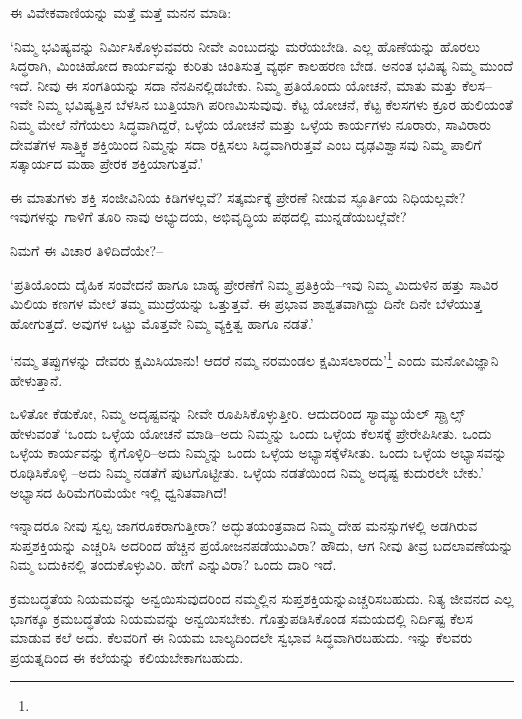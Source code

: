 ಈ ವಿವೇಕವಾಣಿಯನ್ನು ಮತ್ತೆ ಮತ್ತೆ ಮನನ ಮಾಡಿ:

‘ನಿಮ್ಮ ಭವಿಷ್ಯವನ್ನು ನಿರ್ಮಿಸಿಕೊಳ್ಳುವವರು ನೀವೇ ಎಂಬುದನ್ನು ಮರೆಯಬೇಡಿ. ಎಲ್ಲ ಹೊಣೆಯನ್ನು ಹೊರಲು ಸಿದ್ಧರಾಗಿ, ಮಿಂಚಿಹೋದ ಕಾರ್ಯವನ್ನು ಕುರಿತು ಚಿಂತಿಸುತ್ತ ವ್ಯರ್ಥ ಕಾಲಹರಣ ಬೇಡ. ಅನಂತ ಭವಿಷ್ಯ ನಿಮ್ಮ ಮುಂದೆ ಇದೆ. ನೀವು ಈ ಸಂಗತಿಯನ್ನು ಸದಾ ನೆನಪಿನಲ್ಲಿಡಬೇಕು. ನಿಮ್ಮ ಪ್ರತಿಯೊಂದು ಯೋಚನೆ, ಮಾತು ಮತ್ತು ಕೆಲಸ–ಇವೇ ನಿಮ್ಮ ಭವಿಷ್ಯತ್ತಿನ ಬೆಳಸಿನ ಬುತ್ತಿಯಾಗಿ ಪರಿಣಮಿಸುವುವು. ಕೆಟ್ಟ ಯೋಚನೆ, ಕೆಟ್ಟ ಕೆಲಸಗಳು ಕ್ರೂರ ಹುಲಿಯಂತೆ ನಿಮ್ಮ ಮೇಲೆ ನೆಗೆಯಲು ಸಿದ್ಧವಾಗಿದ್ದರೆ, ಒಳ್ಳೆಯ ಯೋಚನೆ ಮತ್ತು ಒಳ್ಳೆಯ ಕಾರ್ಯಗಳು ನೂರಾರು, ಸಾವಿರಾರು ದೇವತೆಗಳ ಸಾತ್ತ್ವಿಕ ಶಕ್ತಿಯಿಂದ ನಿಮ್ಮನ್ನು ಸದಾ ರಕ್ಷಿಸಲು ಸಿದ್ಧವಾಗಿರುತ್ತವೆ ಎಂಬ ದೃಢವಿಶ್ವಾಸವು ನಿಮ್ಮ ಪಾಲಿಗೆ ಸತ್ಕಾರ್ಯದ ಮಹಾ ಪ್ರೇರಕ ಶಕ್ತಿಯಾಗುತ್ತವೆ.’

ಈ ಮಾತುಗಳು ಶಕ್ತಿ ಸಂಜೀವಿನಿಯ ಕಿಡಿಗಳಲ್ಲವೆ? ಸತ್ಕರ್ಮಕ್ಕೆ ಪ್ರೇರಣೆ ನೀಡುವ ಸ್ಫೂರ್ತಿಯ ನಿಧಿಯಲ್ಲವೇ? ಇವುಗಳನ್ನು ಗಾಳಿಗೆ ತೂರಿ ನಾವು ಅಭ್ಯುದಯ, ಅಭಿವೃದ್ಧಿಯ ಪಥದಲ್ಲಿ ಮುನ್ನಡೆಯಬಲ್ಲೆವೇ?

ನಿಮಗೆ ಈ ವಿಚಾರ ತಿಳಿದಿದೆಯೇ?–

‘ಪ್ರತಿಯೊಂದು ದೈಹಿಕ ಸಂವೇದನೆ ಹಾಗೂ ಬಾಹ್ಯ ಪ್ರೇರಣೆಗೆ ನಿಮ್ಮ ಪ್ರತಿಕ್ರಿಯೆ–ಇವು ನಿಮ್ಮ ಮಿದುಳಿನ ಹತ್ತು ಸಾವಿರ ಮಿಲಿಯ ಕಣಗಳ ಮೇಲೆ ತಮ್ಮ ಮುದ್ರೆಯನ್ನು ಒತ್ತುತ್ತವೆ. ಈ ಪ್ರಭಾವ ಶಾಶ್ವತವಾಗಿದ್ದು ದಿನೇ ದಿನೇ ಬೆಳೆಯುತ್ತ ಹೋಗುತ್ತದೆ. ಅವುಗಳ ಒಟ್ಟು ಮೊತ್ತವೇ ನಿಮ್ಮ ವ್ಯಕ್ತಿತ್ವ ಹಾಗೂ ನಡತೆ.’

‘ನಮ್ಮ ತಪ್ಪುಗಳನ್ನು ದೇವರು ಕ್ಷಮಿಸಿಯಾನು! ಆದರೆ ನಮ್ಮ ನರಮಂಡಲ ಕ್ಷಮಿಸಲಾರದು’\footnote{

} ಎಂದು ಮನೋವಿಜ್ಞಾನಿ ಹೇಳುತ್ತಾನೆ.

ಒಳಿತೋ ಕೆಡುಕೋ, ನಿಮ್ಮ ಅದೃಷ್ಟವನ್ನು ನೀವೇ ರೂಪಿಸಿಕೊಳ್ಳುತ್ತೀರಿ. ಆದುದರಿಂದ ಸ್ಯಾಮ್ಯುಯೆಲ್ ಸ್ಮಾೖಲ್ಸ್ ಹೇಳುವಂತೆ ‘ಒಂದು ಒಳ್ಳೆಯ ಯೋಚನೆ ಮಾಡಿ–ಅದು ನಿಮ್ಮನ್ನು ಒಂದು ಒಳ್ಳೆಯ ಕೆಲಸಕ್ಕೆ ಪ್ರೇರೇಪಿಸೀತು. ಒಂದು ಒಳ್ಳೆಯ ಕಾರ್ಯವನ್ನು ಕೈಗೊಳ್ಳಿರಿ–ಅದು ನಿಮ್ಮನ್ನು ಒಂದು ಒಳ್ಳೆಯ ಅಭ್ಯಾಸಕ್ಕೆಳೆಸೀತು. ಒಂದು ಒಳ್ಳೆಯ ಅಭ್ಯಾಸವನ್ನು ರೂಢಿಸಿಕೊಳ್ಳಿ –ಅದು ನಿಮ್ಮ ನಡತೆಗೆ ಪುಟಗೊಟ್ಟೀತು. ಒಳ್ಳೆಯ ನಡತೆಯಿಂದ ನಿಮ್ಮ ಅದೃಷ್ಟ ಕುದುರಲೇ ಬೇಕು.’ ಅಭ್ಯಾಸದ ಹಿರಿಮೆಗರಿಮೆಯೇ ಇಲ್ಲಿ ಧ್ವನಿತವಾಗಿದೆ!

ಇನ್ನಾದರೂ ನೀವು ಸ್ವಲ್ಪ ಜಾಗರೂಕರಾಗುತ್ತೀರಾ? ಅದ್ಭುತಯಂತ್ರವಾದ ನಿಮ್ಮ ದೇಹ ಮನಸ್ಸುಗಳಲ್ಲಿ ಅಡಗಿರುವ ಸುಪ್ತಶಕ್ತಿಯನ್ನು ಎಚ್ಚರಿಸಿ ಅದರಿಂದ ಹೆಚ್ಚಿನ ಪ್ರಯೋಜನ\break ಪಡೆಯುವಿರಾ? ಹೌದು, ಆಗ ನೀವು ತೀವ್ರ ಬದಲಾವಣೆಯನ್ನು ನಿಮ್ಮ ಬದುಕಿನಲ್ಲಿ ತಂದು\-ಕೊಳ್ಳುವಿರಿ. ಹೇಗೆ ಎನ್ನುವಿರಾ? ಒಂದು ದಾರಿ ಇದೆ.

ಕ್ರಮಬದ್ಧತೆಯ ನಿಯಮವನ್ನು ಅನ್ವಯಿಸುವುದರಿಂದ ನಮ್ಮಲ್ಲಿನ ಸುಪ್ತಶಕ್ತಿಯನ್ನು\break ಎಚ್ಚರಿಸಬಹುದು. ನಿತ್ಯ ಜೀವನದ ಎಲ್ಲ ಭಾಗಕ್ಕೂ ಕ್ರಮಬದ್ಧತೆಯ ನಿಯಮವನ್ನು ಅನ್ವಯಿಸಬೇಕು. ಗೊತ್ತುಪಡಿಸಿಕೊಂಡ ಸಮಯದಲ್ಲಿ ನಿರ್ದಿಷ್ಟ ಕೆಲಸ ಮಾಡುವ ಕಲೆ ಅದು. ಕೆಲವರಿಗೆ ಈ ನಿಯಮ ಬಾಲ್ಯದಿಂದಲೇ ಸ್ವಭಾವ ಸಿದ್ಧವಾಗಿರಬಹುದು. ಇನ್ನು ಕೆಲವರು ಪ್ರಯತ್ನದಿಂದ ಈ ಕಲೆಯನ್ನು ಕಲಿಯಬೇಕಾಗಬಹುದು.

